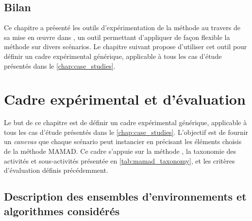 \section*{Bilan}

Ce chapitre a présenté les outils d'expérimentation de la méthode  au travers de sa mise en œuvre dans , un outil permettant d'appliquer de façon flexible la méthode sur divers scénarios. Le chapitre suivant propose d'utiliser cet outil pour définir un cadre expérimental générique, applicable à tous les cas d'étude présentés dans le \autoref{chap:case_studies}.


\clearpage
\thispagestyle{empty}
\null
\newpage

\chapter{Cadre expérimental et d'évaluation}
\label{chap:cadre_experimental}

Le but de ce chapitre est de définir un cadre expérimental générique, applicable à tous les cas d'étude présentés dans le \autoref{chap:case_studies}. L'objectif est de fournir un \textit{canevas} que chaque scénario peut instancier en précisant les éléments choisis de la méthode MAMAD. Ce cadre s'appuie sur la méthode , la taxonomie des activités et sous-activités présentée en \autoref{tab:mamad_taxonomy}, et les critères d'évaluation définis précédemment.

\section{Description des ensembles d'environnements et algorithmes considérés}

